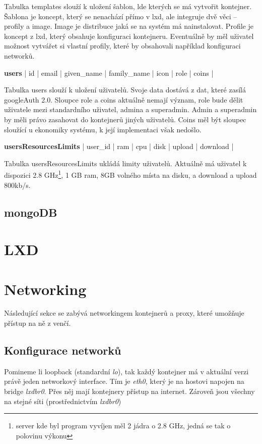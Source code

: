 \documentclass[a4paper,oneside,12pt]{report}
\begin{document}
Tabulka templates slouží k uložení šablon, lde kterých se má vytvořit kontejner.
Šablona je koncept, který se nenachází přímo v lxd, ale integruje dvě věci -- profily a image.
Image je distribuce jaká se na systém má nainstalovat.
Profile je koncept z lxd, který obsahuje konfiguraci kontejneru.
Eventuálně by měl uživatel možnost vytvářet si vlastní profily, které by obsahovali například konfiguraci networků.

\vspace{0.3cm}
\noindent
\textbf{users} | id | email | given\_name | family\_name | icon | role | coins |

Tabulka users slouží k uložení uživatelů.
Svoje data dostává z dat, které zasílá googleAuth 2.0.
Sloupce role a coins aktuálně nemají význam, role bude dělit uživatele mezi standardního uživatel, admina a superadmin.
Admin a superadmin by měli právo zasahovat do kontejnerů jiných uživatelů.
Coins měl být sloupec sloužící u ekonomiky systému, k její implementaci však nedošlo.


\vspace{0.3cm}
\noindent
\textbf{usersResourcesLimits} | user\_id | ram | cpu | disk | upload | download |

Tabulka usersResourcesLimits ukládá limity uživatelů.
Aktuálně má uživatel k dispozici 2.8 GHz\footnote{server kde byl program vyvíjen měl 2 jádra o 2.8 GHz, jedná se tak o polovinu výkonu}, 1 GB ram, 8GB volného místa na disku, a download a upload 800kb/s.

\subsection{mongoDB}


\section{LXD}

\section{Networking}

Následující sekce se zabývá networkingem kontejnerů a proxy, které umožňuje přístup na ně z venčí.

\subsection{Konfigurace networků}

Pomineme li loopback (standardní \textit{lo}), tak každý kontejner má v aktuální verzi právě jeden networkový interface.
Tím je \textit{eth0}, který je na hostovi napojen na bridge \textit{lxdbr0}.
Přes něj mají kontejnery přístup na internet.
Zároveň jsou všechny na stejné síti (prostřednictvím \textit{lxdbr0})
\end{document}
